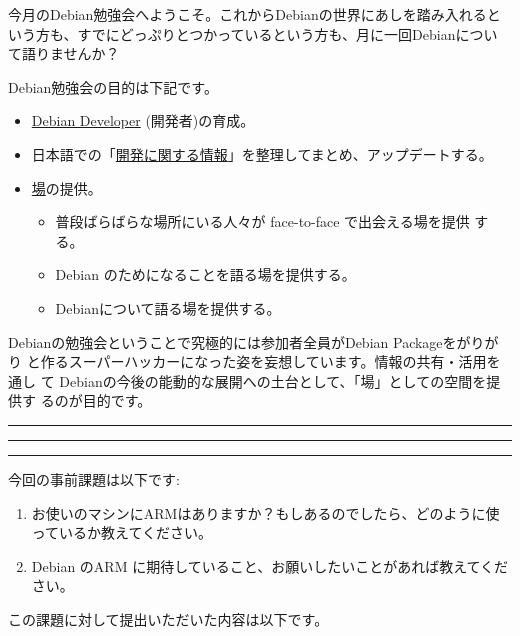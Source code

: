 \documentclass[mingoth,a4paper]{jsarticle}
\begin{document}
\begin{multicols}{2}
 

 今月のDebian勉強会へようこそ。これからDebianの世界にあしを踏み入れると
 いう方も、すでにどっぷりとつかっているという方も、月に一回Debianについ
 て語りませんか？

 Debian勉強会の目的は下記です。

 \begin{itemize}
 \item \underline{Debian Developer} (開発者)の育成。
 \item 日本語での「\underline{開発に関する情報}」を整理してまとめ、アップデートする。
 \item \underline{場}の提供。
 \begin{itemize}
  \item 普段ばらばらな場所にいる人々が face-to-face で出会える場を提供
	する。
  \item Debian のためになることを語る場を提供する。
  \item Debianについて語る場を提供する。
 \end{itemize}
 \end{itemize}		

 Debianの勉強会ということで究極的には参加者全員がDebian Packageをがりがり
 と作るスーパーハッカーになった姿を妄想しています。情報の共有・活用を通し
 て Debianの今後の能動的な展開への土台として、「場」としての空間を提供す
 るのが目的です。

\end{multicols}

\newpage

\begin{minipage}[b]{0.2\hsize}
 \colorbox{titleback}{}
\end{minipage}
\begin{minipage}[b]{0.8\hsize}
\hrule
\vspace{2mm}
\hrule
\begin{multicols}{2}
\tableofcontents
\end{multicols}
\vspace{2mm}
\hrule
\end{minipage}


今回の事前課題は以下です:
\begin{enumerate}
 \item お使いのマシンにARMはありますか？もしあるのでしたら、どのように使っているか教えてください。
 \item Debian のARM に期待していること、お願いしたいことがあれば教えてください。
\end{enumerate}
この課題に対して提出いただいた内容は以下です。
\begin{multicols}{2}
{\small

}
\end{multicols}
\end{document}
